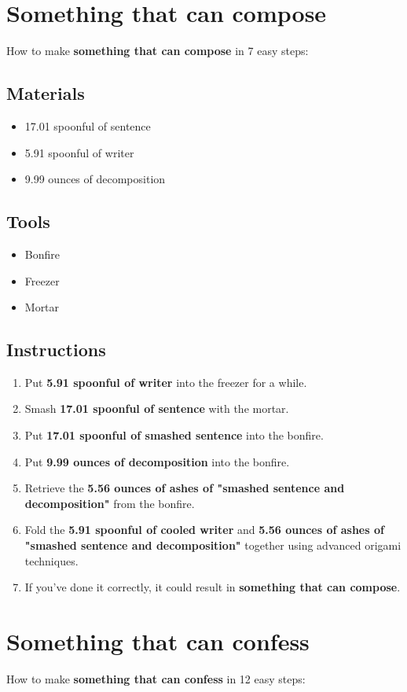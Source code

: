 \documentclass{article}
\begin{document}
\section{Something that can compose}How to make \textbf{something that can compose} in 7 easy steps:

\subsection{Materials}\begin{itemize}
\item 
17.01 spoonful of sentence
\item 
5.91 spoonful of writer
\item 
9.99 ounces of decomposition
\end{itemize}
\subsection{Tools}\begin{itemize}
\item 
Bonfire
\item 
Freezer
\item 
Mortar
\end{itemize}
\subsection{Instructions}\begin{enumerate}
\item 
Put \textbf{5.91 spoonful of writer} into the freezer for a while.
\item 
Smash \textbf{17.01 spoonful of sentence} with the mortar.
\item 
Put \textbf{17.01 spoonful of smashed sentence} into the bonfire.
\item 
Put \textbf{9.99 ounces of decomposition} into the bonfire.
\item 
Retrieve the \textbf{5.56 ounces of ashes of "smashed sentence and decomposition"} from the bonfire.
\item 
Fold the \textbf{5.91 spoonful of cooled writer} and \textbf{5.56 ounces of ashes of "smashed sentence and decomposition"} together using advanced origami techniques.
\item 
If you've done it correctly, it could result in \textbf{something that can compose}.
\end{enumerate}
\newpage
\section{Something that can confess}How to make \textbf{something that can confess} in 12 easy steps:
\end{document}
